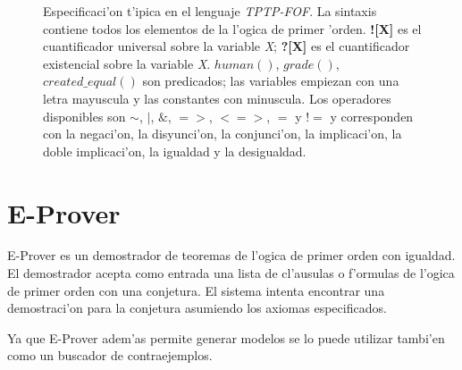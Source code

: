 \begin{figure}[]
\caption{Especificaci'on t'ipica en el lenguaje \textit{TPTP-FOF}. La sintaxis contiene todos los elementos de la l'ogica de primer 'orden. \textbf{![X]} es el cuantificador universal sobre la variable \textit{X}; \textbf{?[X]} es el cuantificador existencial sobre la variable \textit{X}. \textit{$human()$}, \textit{$grade()$}, \textit{$created\_equal()$} son predicados; las variables empiezan con una letra mayuscula y las constantes con minuscula. Los operadores disponibles son $\sim$, $|$, $\&$, $=>$, $<=>$, $=$ y $!=$ y corresponden con la negaci'on, la disyunci'on, la conjunci'on, la implicaci'on, la doble implicaci'on, la igualdad y la desigualdad.}
\label{ejemplofof}
\end{figure}


\section{E-Prover}

E-Prover es un demostrador de teoremas de l'ogica de primer orden con igualdad. El demostrador acepta como entrada una lista de cl'ausulas o f'ormulas de l'ogica de primer orden con una conjetura. El sistema intenta encontrar una demostraci'on para la conjetura asumiendo los axiomas especificados.

Ya que E-Prover adem'as permite generar modelos se lo puede utilizar tambi'en como un buscador de contraejemplos.

